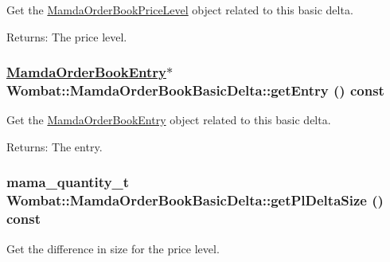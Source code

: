 Get the \hyperlink{classWombat_1_1MamdaOrderBookPriceLevel}{Mamda\-Order\-Book\-Price\-Level} object related to this basic delta. 

\begin{Desc}
\item[Returns:]The price level. \end{Desc}
\hypertarget{classWombat_1_1MamdaOrderBookBasicDelta_5a631f929f45d7b8a476ff8bd97d6236}{
\subsubsection[getEntry]{\setlength{\rightskip}{0pt plus 5cm}\hyperlink{classWombat_1_1MamdaOrderBookEntry}{Mamda\-Order\-Book\-Entry}$\ast$ Wombat::Mamda\-Order\-Book\-Basic\-Delta::get\-Entry () const}}
\label{classWombat_1_1MamdaOrderBookBasicDelta_5a631f929f45d7b8a476ff8bd97d6236}


Get the \hyperlink{classWombat_1_1MamdaOrderBookEntry}{Mamda\-Order\-Book\-Entry} object related to this basic delta. 

\begin{Desc}
\item[Returns:]The entry. \end{Desc}
\hypertarget{classWombat_1_1MamdaOrderBookBasicDelta_53cad3d942a1c100cdbadc0cf0f4ddd3}{
\subsubsection[getPlDeltaSize]{\setlength{\rightskip}{0pt plus 5cm}mama\_\-quantity\_\-t Wombat::Mamda\-Order\-Book\-Basic\-Delta::get\-Pl\-Delta\-Size () const}}
\label{classWombat_1_1MamdaOrderBookBasicDelta_53cad3d942a1c100cdbadc0cf0f4ddd3}


Get the difference in size for the price level. 

